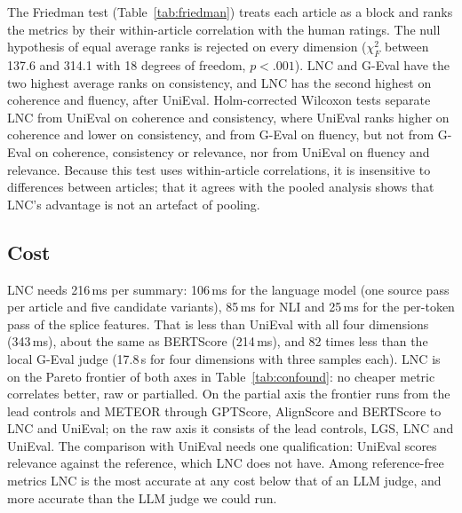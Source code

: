 The Friedman test (Table~\ref{tab:friedman}) treats each article as a block and ranks the metrics by their within-article correlation with the human ratings. The null hypothesis of equal average ranks is rejected on every dimension ($\chi^2_F$ between 137.6 and 314.1 with 18 degrees of freedom, $p<.001$). LNC and G-Eval have the two highest average ranks on consistency, and LNC has the second highest on coherence and fluency, after UniEval. Holm-corrected Wilcoxon tests separate LNC from UniEval on coherence and consistency, where UniEval ranks higher on coherence and lower on consistency, and from G-Eval on fluency, but not from G-Eval on coherence, consistency or relevance, nor from UniEval on fluency and relevance. Because this test uses within-article correlations, it is insensitive to differences between articles; that it agrees with the pooled analysis shows that LNC's advantage is not an artefact of pooling.

\subsection{Cost}

LNC needs 216\,ms per summary: 106\,ms for the language model (one source pass per article and five candidate variants), 85\,ms for NLI and 25\,ms for the per-token pass of the splice features. That is less than UniEval with all four dimensions (343\,ms), about the same as BERTScore (214\,ms), and 82 times less than the local G-Eval judge (17.8\,s for four dimensions with three samples each). LNC is on the Pareto frontier of both axes in Table~\ref{tab:confound}: no cheaper metric correlates better, raw or partialled. On the partial axis the frontier runs from the lead controls and METEOR through GPTScore, AlignScore and BERTScore to LNC and UniEval; on the raw axis it consists of the lead controls, LGS, LNC and UniEval. The comparison with UniEval needs one qualification: UniEval scores relevance against the reference, which LNC does not have. Among reference-free metrics LNC is the most accurate at any cost below that of an LLM judge, and more accurate than the LLM judge we could run.
